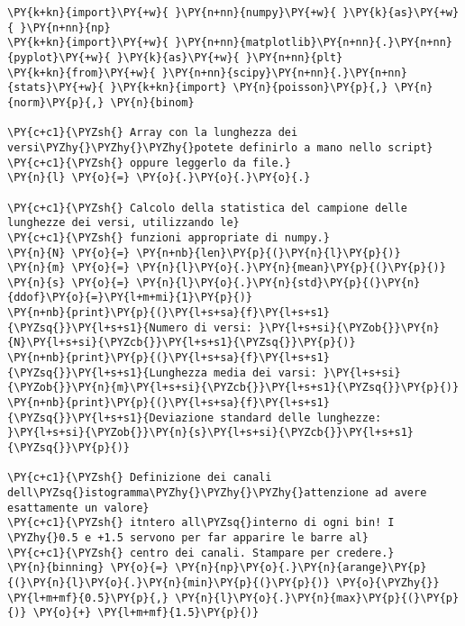 \begin{Verbatim}[label=\makebox{\href{https://github.com/unipi-physics-labs/lab1-sheets/tree/main/snippy/dad_conteggi.py}{https://github.com/.../dad\_conteggi.py}},commandchars=\\\{\}]
\PY{k+kn}{import}\PY{+w}{ }\PY{n+nn}{numpy}\PY{+w}{ }\PY{k}{as}\PY{+w}{ }\PY{n+nn}{np}
\PY{k+kn}{import}\PY{+w}{ }\PY{n+nn}{matplotlib}\PY{n+nn}{.}\PY{n+nn}{pyplot}\PY{+w}{ }\PY{k}{as}\PY{+w}{ }\PY{n+nn}{plt}
\PY{k+kn}{from}\PY{+w}{ }\PY{n+nn}{scipy}\PY{n+nn}{.}\PY{n+nn}{stats}\PY{+w}{ }\PY{k+kn}{import} \PY{n}{poisson}\PY{p}{,} \PY{n}{norm}\PY{p}{,} \PY{n}{binom}

\PY{c+c1}{\PYZsh{} Array con la lunghezza dei versi\PYZhy{}\PYZhy{}\PYZhy{}potete definirlo a mano nello script}
\PY{c+c1}{\PYZsh{} oppure leggerlo da file.}
\PY{n}{l} \PY{o}{=} \PY{o}{.}\PY{o}{.}\PY{o}{.}

\PY{c+c1}{\PYZsh{} Calcolo della statistica del campione delle lunghezze dei versi, utilizzando le}
\PY{c+c1}{\PYZsh{} funzioni appropriate di numpy.}
\PY{n}{N} \PY{o}{=} \PY{n+nb}{len}\PY{p}{(}\PY{n}{l}\PY{p}{)}
\PY{n}{m} \PY{o}{=} \PY{n}{l}\PY{o}{.}\PY{n}{mean}\PY{p}{(}\PY{p}{)}
\PY{n}{s} \PY{o}{=} \PY{n}{l}\PY{o}{.}\PY{n}{std}\PY{p}{(}\PY{n}{ddof}\PY{o}{=}\PY{l+m+mi}{1}\PY{p}{)}
\PY{n+nb}{print}\PY{p}{(}\PY{l+s+sa}{f}\PY{l+s+s1}{\PYZsq{}}\PY{l+s+s1}{Numero di versi: }\PY{l+s+si}{\PYZob{}}\PY{n}{N}\PY{l+s+si}{\PYZcb{}}\PY{l+s+s1}{\PYZsq{}}\PY{p}{)}
\PY{n+nb}{print}\PY{p}{(}\PY{l+s+sa}{f}\PY{l+s+s1}{\PYZsq{}}\PY{l+s+s1}{Lunghezza media dei varsi: }\PY{l+s+si}{\PYZob{}}\PY{n}{m}\PY{l+s+si}{\PYZcb{}}\PY{l+s+s1}{\PYZsq{}}\PY{p}{)}
\PY{n+nb}{print}\PY{p}{(}\PY{l+s+sa}{f}\PY{l+s+s1}{\PYZsq{}}\PY{l+s+s1}{Deviazione standard delle lunghezze: }\PY{l+s+si}{\PYZob{}}\PY{n}{s}\PY{l+s+si}{\PYZcb{}}\PY{l+s+s1}{\PYZsq{}}\PY{p}{)}

\PY{c+c1}{\PYZsh{} Definizione dei canali dell\PYZsq{}istogramma\PYZhy{}\PYZhy{}\PYZhy{}attenzione ad avere esattamente un valore}
\PY{c+c1}{\PYZsh{} itntero all\PYZsq{}interno di ogni bin! I \PYZhy{}0.5 e +1.5 servono per far apparire le barre al}
\PY{c+c1}{\PYZsh{} centro dei canali. Stampare per credere.}
\PY{n}{binning} \PY{o}{=} \PY{n}{np}\PY{o}{.}\PY{n}{arange}\PY{p}{(}\PY{n}{l}\PY{o}{.}\PY{n}{min}\PY{p}{(}\PY{p}{)} \PY{o}{\PYZhy{}} \PY{l+m+mf}{0.5}\PY{p}{,} \PY{n}{l}\PY{o}{.}\PY{n}{max}\PY{p}{(}\PY{p}{)} \PY{o}{+} \PY{l+m+mf}{1.5}\PY{p}{)}


\end{Verbatim}
